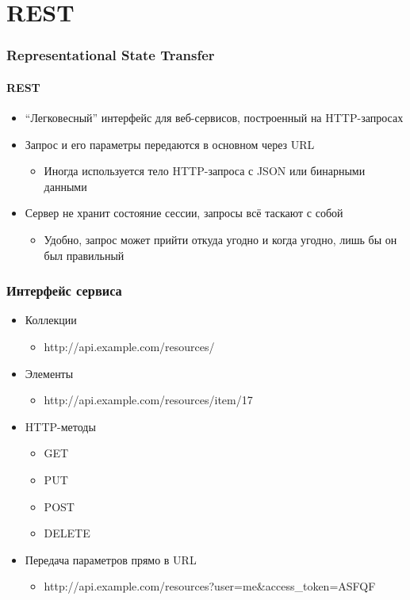 \documentclass[xetex,mathserif,serif]{beamer}
\begin{document}
	\section{REST}

	\begin{frame}
		\frametitle{Representational State Transfer}
		\framesubtitle{REST}
		\begin{itemize}
			\item ``Легковесный'' интерфейс для веб-сервисов, построенный на HTTP-запросах
			\item Запрос и его параметры передаются в основном через URL
			\begin{itemize}
				\item Иногда используется тело HTTP-запроса с JSON или бинарными данными
			\end{itemize}
			\item Сервер не хранит состояние сессии, запросы всё таскают с собой
			\begin{itemize}
				\item Удобно, запрос может прийти откуда угодно и когда угодно, лишь бы он был правильный
			\end{itemize}
		\end{itemize}
	\end{frame}

	\begin{frame}
		\frametitle{Интерфейс сервиса}
		\begin{itemize}
			\item Коллекции
			\begin{itemize}
				\item http://api.example.com/resources/
			\end{itemize}
			\item Элементы
			\begin{itemize}
				\item http://api.example.com/resources/item/17
			\end{itemize}
			\item HTTP-методы
			\begin{itemize}
				\item GET
				\item PUT
				\item POST
				\item DELETE
			\end{itemize}
			\item Передача параметров прямо в URL
			\begin{itemize}
				\item http://api.example.com/resources?user=me\&access\_token=ASFQF
			\end{itemize}
		\end{itemize}
	\end{frame}
\end{document}
